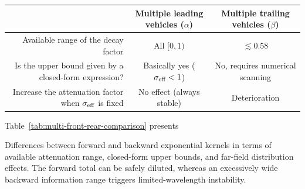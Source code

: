 \documentclass[11pt,a4paper,openany]{book}
\numberwithin{equation}{chapter}
\numberwithin{figure}{chapter}
\numberwithin{table}{chapter}
\newcommand{\tabletext}[2]{%
  \par\smallskip\noindent
  Table~\ref{#1} presents #2
\par\smallskip
}
\begin{document}
\begin{center}
\label{tab:multi-front-rear-comparison}
\begin{tabular}{rcc}
\toprule
&




 Multiple leading vehicles ($\alpha$)




&




Multiple trailing vehicles ($\beta$)



\\
\midrule







Available range of the decay factor




&




 All $[0,1)$




& $\lesssim0.58$ \\







Is the upper bound given by a closed-form expression?




&




 Basically yes ($\sigma_{\rm eff}<1$)




&




 No, requires numerical scanning



\\







Increase the attenuation factor when $\sigma_{\rm eff}$ is fixed




&




 No effect (always stable)




&




 Deterioration



\\
\bottomrule
\end{tabular}
\end{center}
\tabletext{tab:multi-front-rear-comparison}{




Differences between forward and backward exponential kernels in terms of available attenuation range, closed-form upper bounds, and far-field distribution effects. The forward total can be safely diluted, whereas an excessively wide backward information range triggers limited-wavelength instability.}
\end{document}
